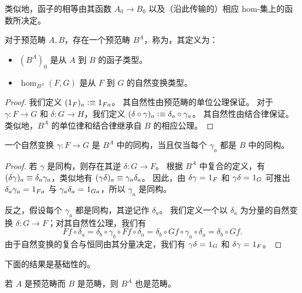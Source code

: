 类似地，函子的相等由其函数 $A_0\to B_0$ 以及（沿此传输的）相应 hom-集上的函数所决定。

\begin{defn}\label{ct:functor-precat}
  对于预范畴 $A,B$，存在一个预范畴 $B^A$，称为，其定义为：
  \begin{itemize}
  \item $(B^A)_0$ 是从 $A$ 到 $B$ 的函子类型。
  \item $\hom_{B^A}(F,G)$ 是从 $F$ 到 $G$ 的自然变换类型。
  \end{itemize}
\end{defn}

\begin{proof}
  我们定义 $(1_F)_a\vcentcolon\equiv 1_{Fa}$。
  其自然性由预范畴的单位公理保证。
  对于 $\gamma:F\to G$ 和 $\delta:G\to H$，我们定义 $(\delta\circ\gamma)_a\vcentcolon\equiv \delta_a\circ \gamma_a$。
  其自然性由结合律保证。
  类似地，$B^A$ 的单位律和结合律继承自 $B$ 的相应公理。
\end{proof}

\begin{lem}\label{ct:natiso}
  一个自然变换 $\gamma:F\to G$ 是 $B^A$ 中的同构，当且仅当每个 $\gamma_a$ 都是 $B$ 中的同构。
\end{lem}

\begin{proof}
  若 $\gamma$ 是同构，则存在其逆 $\delta:G\to F$。
  根据 $B^A$ 中复合的定义，有 $(\delta\gamma)_a\equiv \delta_a\gamma_a$，类似地有 $(\gamma\delta)_a\equiv \gamma_a\delta_a$。
  因此，由 $\delta\gamma =_{} 1_F$ 和 $\gamma\delta =_{} 1_G$ 可推出 $\delta_a\gamma_a =_{} 1_{Fa}$ 与 $\gamma_a\delta_a =_{} 1_{Ga}$，所以 $\gamma_a$ 是同构。

  反之，假设每个 $\gamma_a$ 都是同构，其逆记作 $\delta_a$。
  我们定义一个以 $\delta_a$ 为分量的自然变换 $\delta:G\to F$；对其自然性公理，我们有
  \[ Ff\circ \delta_a = \delta_b\circ \gamma_b\circ Ff \circ \delta_a = \delta_b\circ Gf\circ \gamma_a\circ \delta_a = \delta_b\circ Gf. \]
  由于自然变换的复合与恒同由其分量决定，我们有 $\gamma\delta =_{} 1_G$ 和 $\delta\gamma =_{} 1_F$。
\end{proof}

下面的结果是基础性的。

\begin{thm}\label{ct:functor-cat}
  若 $A$ 是预范畴而 $B$ 是范畴，则 $B^A$ 也是范畴。
\end{thm}

